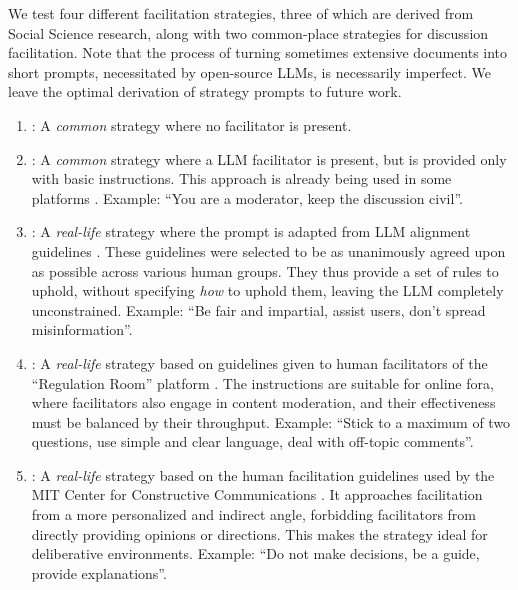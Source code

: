 We test four different facilitation strategies, three of which are derived from Social Science research, along with two common-place strategies for discussion facilitation. Note that the process of turning sometimes extensive documents into short prompts, necessitated by open-source LLMs, is necessarily imperfect. We leave the optimal derivation of strategy prompts to future work.

\begin{enumerate}
    \item \textbf{\strategynomod}: A \emph{common} strategy where no facilitator is present.

    \item \textbf{\strategynoinstr}: A \emph{common} strategy where a LLM facilitator is present, but is provided only with basic instructions. This approach is already being used in some platforms \citep{Tsai_Deliberate_Lab_Open-Source_2025}. Example: “You are a moderator, keep the discussion civil”. 

    \item \textbf{\strategyrules}: A \emph{real-life} strategy where the prompt is adapted from LLM alignment guidelines \cite{collective_constitution}. These guidelines were selected to be as unanimously agreed upon as possible across various human groups. They thus provide a set of rules to uphold, without specifying \emph{how} to uphold them, leaving the LLM completely unconstrained. Example: ``Be fair and impartial, assist users, don't spread misinformation''.

    \item \textbf{\strategyregroom}: A \emph{real-life} strategy based on guidelines given to human facilitators of the ``Regulation Room'' platform \citep{Cornell_eRulemaking2017}. The instructions are suitable for online fora, where facilitators also engage in content moderation, and their effectiveness must be balanced by their throughput. Example: ``Stick to a maximum of two questions, use simple and clear language, deal with off-topic comments''.

    \item \textbf{\strategyconstrcomm}: A \emph{real-life} strategy based on the human facilitation guidelines used by the MIT Center for Constructive Communications \cite{dimitra-book}. It approaches facilitation from a more personalized and indirect angle, forbidding facilitators from directly providing opinions or directions. This makes the strategy ideal for deliberative environments. Example: ``Do not make decisions, be a guide, provide explanations''.
    

\end{enumerate}

